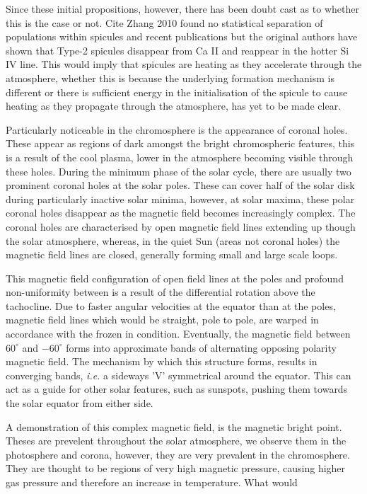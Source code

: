 
Since these initial propositions, however, there has been doubt cast as to whether this is the case or not. 
Cite Zhang 2010 found no statistical separation of populations within spicules and recent publications but the original authors have shown that Type-2 spicules disappear from Ca II and reappear in the hotter Si IV line.
This would imply that spicules are heating as they accelerate through the atmosphere, whether this is because the underlying formation mechanism is different or there is sufficient energy in the initialisation of the spicule to cause heating as they propagate through the atmosphere, has yet to be made clear.

Particularly noticeable in the chromosphere is the appearance of coronal holes.
These appear as regions of dark amongst the bright chromospheric features, this is a result of the cool plasma, lower in the atmosphere becoming visible through these holes.
During the minimum phase of the solar cycle, there are usually two prominent coronal holes at the solar poles. 
These can cover half of the solar disk during particularly inactive solar minima, however, at solar maxima, these polar coronal holes disappear as the magnetic field becomes increasingly complex.
The coronal holes are characterised by open magnetic field lines extending up though the solar atmosphere, whereas, in the quiet Sun (areas not coronal holes) the magnetic field lines are closed, generally forming small and large scale loops.

This magnetic field configuration of open field lines at the poles and profound non-uniformity between is a result of the differential rotation above the tachocline.
Due to faster angular velocities at the equator than at the poles, magnetic field lines which would be straight, pole to pole, are warped in accordance with the frozen in condition.
Eventually, the magnetic field between $60^\circ$ and $-60^\circ$ forms into approximate bands of alternating opposing polarity magnetic field.
The mechanism by which this structure forms, results in converging bands, \emph{i.e.} a sideways 'V' symmetrical around the equator.
This can act as a guide for other solar features, such as sunspots, pushing them towards the solar equator from either side.

A demonstration of this complex magnetic field, is the magnetic bright point.
Theses are prevelent throughout the solar atmosphere, we observe them in the photosphere and corona, however, they are very prevalent in the chromosphere.
They are thought to be regions of very high magnetic pressure, causing higher gas pressure and therefore an increase in temperature.
What would 

